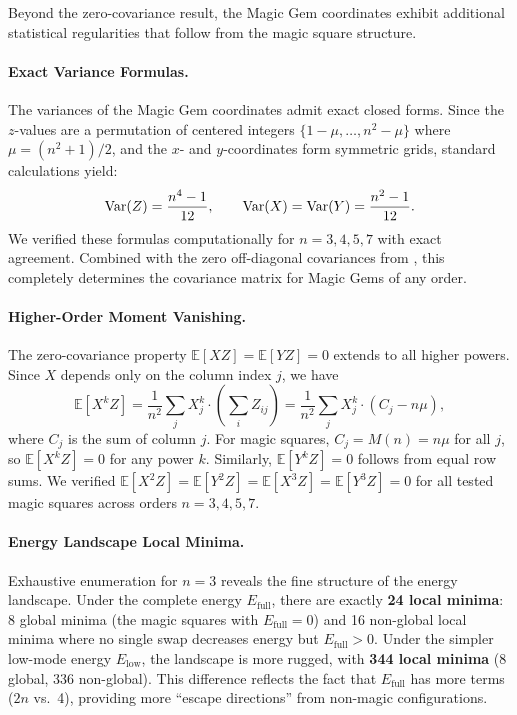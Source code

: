 Beyond the zero-covariance result, the Magic Gem coordinates exhibit additional statistical regularities
that follow from the magic square structure.

\paragraph{Exact Variance Formulas.}
The variances of the Magic Gem coordinates admit exact closed forms.
Since the $z$-values are a permutation of centered integers $\{1-\mu, \ldots, n^2-\mu\}$ 
where $\mu = (n^2+1)/2$, and the $x$- and $y$-coordinates form symmetric grids,
standard calculations yield:
\begin{equation}
\mathrm{Var}(Z) = \frac{n^4 - 1}{12}, \qquad \mathrm{Var}(X) = \mathrm{Var}(Y) = \frac{n^2 - 1}{12}.
\end{equation}
We verified these formulas computationally for $n = 3, 4, 5, 7$ with exact agreement.
Combined with the zero off-diagonal covariances from ,
this completely determines the covariance matrix for Magic Gems of any order.

\paragraph{Higher-Order Moment Vanishing.}
The zero-covariance property $\mathbb{E}[XZ] = \mathbb{E}[YZ] = 0$ extends to all higher powers.
Since $X$ depends only on the column index $j$, we have
\[
\mathbb{E}[X^k Z] = \frac{1}{n^2} \sum_j X_j^k \cdot \left( \sum_i Z_{ij} \right) 
= \frac{1}{n^2} \sum_j X_j^k \cdot (C_j - n\mu),
\]
where $C_j$ is the sum of column $j$.
For magic squares, $C_j = M(n) = n\mu$ for all $j$, so $\mathbb{E}[X^k Z] = 0$ for any power $k$.
Similarly, $\mathbb{E}[Y^k Z] = 0$ follows from equal row sums.
We verified $\mathbb{E}[X^2 Z] = \mathbb{E}[Y^2 Z] = \mathbb{E}[X^3 Z] = \mathbb{E}[Y^3 Z] = 0$
for all tested magic squares across orders $n = 3, 4, 5, 7$.

\paragraph{Energy Landscape Local Minima.}
Exhaustive enumeration for $n = 3$ reveals the fine structure of the energy landscape.
Under the complete energy $E_{\mathrm{full}}$, there are exactly \textbf{24 local minima}:
8 global minima (the magic squares with $E_{\mathrm{full}} = 0$) and 16 non-global local minima
where no single swap decreases energy but $E_{\mathrm{full}} > 0$.
Under the simpler low-mode energy $E_{\mathrm{low}}$, the landscape is more rugged,
with \textbf{344 local minima} (8 global, 336 non-global).
This difference reflects the fact that $E_{\mathrm{full}}$ has more terms ($2n$ vs.\ 4),
providing more ``escape directions'' from non-magic configurations.

